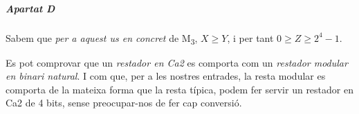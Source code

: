 \subparagraph{Apartat D} Sabem que \emph{per a aquest us en concret} de \textsf{M\textsubscript{3}}, $X \ge Y$, i per tant $0 \ge Z \ge 2^4-1$.

Es pot comprovar que un \emph{restador en Ca2} es comporta com un \emph{restador modular en binari natural}. I com que, per a les nostres entrades, la resta modular es comporta de la mateixa forma que la resta típica, podem fer servir un restador en Ca2 de 4 bits, sense preocupar-nos de fer cap conversió.

\finishpage


